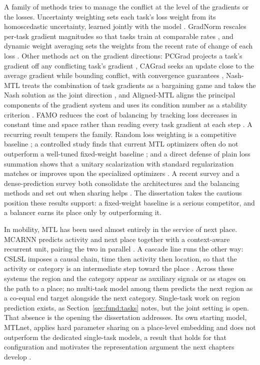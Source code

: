 A family of methods tries to manage the conflict at the level of the gradients or the
losses. Uncertainty weighting sets each task's loss weight from its homoscedastic
uncertainty, learned jointly with the model \cite{kendall2018uncertainty}. GradNorm
rescales per-task gradient magnitudes so that tasks train at comparable rates
\cite{chen2018gradnorm}, and dynamic weight averaging sets the weights from the recent
rate of change of each loss \cite{liu2019dwa}. Other methods act on the gradient
directions: PCGrad projects a task's gradient off any conflicting task's gradient
\cite{yu2020pcgrad}, CAGrad seeks an update close to the average gradient while
bounding conflict, with convergence guarantees \cite{liu2021cagrad}, Nash-MTL treats
the combination of task gradients as a bargaining game and takes the Nash solution as
the joint direction \cite{navon2022nashmtl}, and Aligned-MTL aligns the principal
components of the gradient system and uses its condition number as a stability
criterion \cite{senushkin2023aligned}. FAMO reduces the cost of balancing by tracking
loss decreases in constant time and space rather than reading every task gradient at
each step \cite{liu2023famo}. A recurring result tempers the family. Random loss
weighting is a competitive baseline \cite{lin2022rlw}; a controlled study finds that
current MTL optimizers often do not outperform a well-tuned fixed-weight baseline
\cite{xin2022domtl}; and a direct defense of plain loss summation shows that a unitary
scalarization with standard regularization matches or improves upon the specialized
optimizers \cite{kurin2022scalarization}. A recent survey and a dense-prediction survey
both consolidate the architectures and the balancing methods and set out when sharing
helps \cite{vandenhende2022mtl,yu2024survey}. The dissertation takes the cautious
position these results support: a fixed-weight baseline is a serious competitor, and a
balancer earns its place only by outperforming it.

In mobility, MTL has been used almost entirely in the service of next place. MCARNN
predicts activity and next place together with a context-aware recurrent unit, pairing
the two in parallel \cite{Liao2018}. A cascade line runs the other way: CSLSL imposes
a causal chain, time then activity then location, so that the activity or category is
an intermediate step toward the place \cite{huang2024cslsl}. Across these systems the
region and the category appear as auxiliary signals or as stages on the path to a
place; no multi-task model among them predicts the next region as a co-equal end
target alongside the next category. Single-task work on region prediction exists,
as Section~\ref{sec:fund:tasks} notes, but the joint setting is open. That absence
is the opening the dissertation addresses. Its own starting model, MTLnet, applies
hard parameter sharing on a place-level embedding and does not outperform the dedicated
single-task models, a result that holds for that configuration and motivates the
representation argument the next chapters develop \cite{silva2025mtlnet}.

